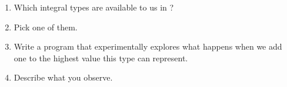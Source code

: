 \begin{enumerate}
  \item Which integral types are available to us in \csharp?
  \item Pick one of them.
  \item Write a program that experimentally explores what happens when we add one to the highest value this type can represent.
  \item Describe what you observe.
\end{enumerate}

